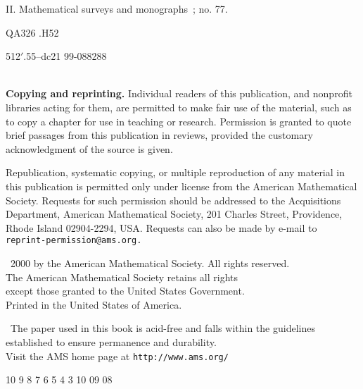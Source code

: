 \begin{copyrightpage}
II. Mathematical surveys and monographs\, ; no. 77.

QA326 .H52 

512$'$.55--dc21 \hfill 99-088288

\hrulefill\\

\textbf{Copying and reprinting.} Individual readers of this
publication, and nonprofit libraries acting for them, are permitted
to make fair use of the material, such as to copy a chapter for use
in teaching or research. Permission is granted to quote brief
passages from this publication in reviews, provided the customary
acknowledgment of the source is given.

Republication, systematic copying, or multiple reproduction of any
material in this publication is permitted only under license from
the American Mathematical Society. Requests for such permission
should be addressed to the Acquisitions Department, American
Mathematical Society, 201 Charles Street, Providence, Rhode Island
02904-2294, USA. Requests can also be made by e-mail to
\texttt{reprint-permission@ams.org.}

\begin{center}
\textcopyright\ 2000 by the American Mathematical Society. All
rights reserved.\\
The American Mathematical Society retains all rights\\
except those granted to the United States Government.\\
Printed in the United States of America.

\circledinfty\ The paper used in this book is acid-free and falls
within the guidelines\\
established to ensure permanence and durability.\\
Visit the AMS home page at \texttt{http://www.ams.org/}

10 9 8 7 6 5 4 3  10 09 08
\end{center}
\end{copyrightpage}
